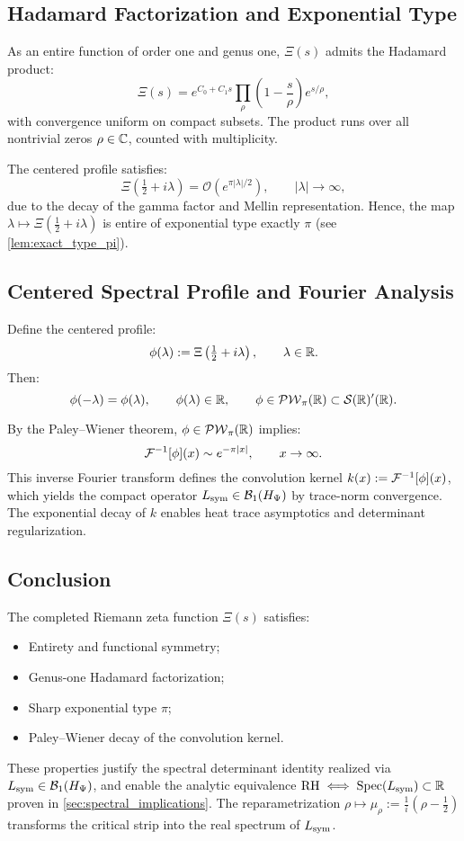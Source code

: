 \subsection*{Hadamard Factorization and Exponential Type}

As an entire function of order one and genus one, \( \Xi(s) \) admits the Hadamard product:
\[
\Xi(s) = e^{C_0 + C_1 s} \prod_{\rho} \left( 1 - \frac{s}{\rho} \right) e^{s/\rho},
\]
with convergence uniform on compact subsets. The product runs over all nontrivial zeros \( \rho \in \mathbb{C} \), counted with multiplicity.

The centered profile satisfies:
\[
\Xi\left( \tfrac{1}{2} + i\lambda \right) = \mathcal{O}\left( e^{\pi |\lambda| / 2} \right), \qquad |\lambda| \to \infty,
\]
due to the decay of the gamma factor and Mellin representation. Hence, the map \( \lambda \mapsto \Xi(\tfrac{1}{2} + i\lambda) \) is entire of exponential type exactly \( \pi \) (see \cref{lem:exact_type_pi}).

\subsection*{Centered Spectral Profile and Fourier Analysis}

Define the centered profile:
\[
\phi(\lambda) := \Xi\left( \tfrac{1}{2} + i\lambda \right), \qquad \lambda \in \mathbb{R}.
\]
Then:
\[
\phi(-\lambda) = \phi(\lambda), \qquad \phi(\lambda) \in \mathbb{R}, \qquad \phi \in \mathcal{PW}_{\pi}(\mathbb{R}) \subset \mathcal{S}(\mathbb{R})'(\mathbb{R}).
\]

By the Paley–Wiener theorem, \( \phi \in \mathcal{PW}_{\pi}(\mathbb{R}) \) implies:
\[
\mathcal{F}^{-1}[\phi](x) \sim e^{-\pi |x|}, \qquad x \to \infty.
\]
This inverse Fourier transform defines the convolution kernel \( k(x) := \mathcal{F}^{-1}[\phi](x) \), which yields the compact operator \( L_{\mathrm{sym}} \in \mathcal{B}_1(H_{\Psi}) \) by trace-norm convergence. The exponential decay of \( k \) enables heat trace asymptotics and determinant regularization.

\subsection*{Conclusion}

The completed Riemann zeta function \( \Xi(s) \) satisfies:
\begin{itemize}
  \item Entirety and functional symmetry;
  \item Genus-one Hadamard factorization;
  \item Sharp exponential type \( \pi \);
  \item Paley–Wiener decay of the convolution kernel.
\end{itemize}

These properties justify the spectral determinant identity realized via \( L_{\mathrm{sym}} \in \mathcal{B}_1(H_{\Psi}) \), and enable the analytic equivalence \( \mathrm{RH} \iff \operatorname{Spec}(L_{\mathrm{sym}}) \subset \mathbb{R} \) proven in \cref{sec:spectral_implications}. The reparametrization \( \rho \mapsto \mu_\rho := \frac{1}{i}(\rho - \tfrac{1}{2}) \) transforms the critical strip into the real spectrum of \( L_{\mathrm{sym}} \).
